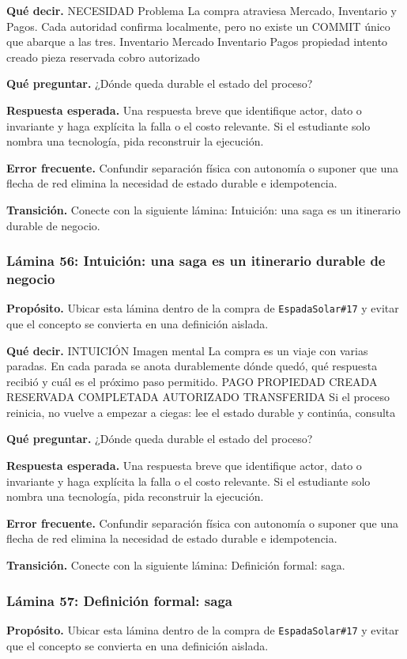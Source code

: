 \documentclass[variant=docente,cover=institutional,mode=screen]{ua-engineering-v6-article}
\begin{document}
\textbf{Qué decir.} NECESIDAD Problema La compra atraviesa Mercado, Inventario y Pagos. Cada autoridad confirma localmente, pero no existe un COMMIT único que abarque a las tres. Inventario Mercado Inventario Pagos propiedad intento creado pieza reservada cobro autorizado

\textbf{Qué preguntar.} ¿Dónde queda durable el estado del proceso?

\textbf{Respuesta esperada.} Una respuesta breve que identifique actor, dato o invariante y haga explícita la falla o el costo relevante. Si el estudiante solo nombra una tecnología, pida reconstruir la ejecución.

\textbf{Error frecuente.} Confundir separación física con autonomía o suponer que una flecha de red elimina la necesidad de estado durable e idempotencia.

\textbf{Transición.} Conecte con la siguiente lámina: Intuición: una saga es un itinerario durable de negocio.

\subsubsection*{Lámina 56: Intuición: una saga es un itinerario durable de negocio}
\textbf{Propósito.} Ubicar esta lámina dentro de la compra de \texttt{EspadaSolar\#17} y evitar que el concepto se convierta en una definición aislada.

\textbf{Qué decir.} INTUICIÓN Imagen mental La compra es un viaje con varias paradas. En cada parada se anota durablemente dónde quedó, qué respuesta recibió y cuál es el próximo paso permitido. PAGO PROPIEDAD CREADA RESERVADA COMPLETADA AUTORIZADO TRANSFERIDA Si el proceso reinicia, no vuelve a empezar a ciegas: lee el estado durable y continúa, consulta

\textbf{Qué preguntar.} ¿Dónde queda durable el estado del proceso?

\textbf{Respuesta esperada.} Una respuesta breve que identifique actor, dato o invariante y haga explícita la falla o el costo relevante. Si el estudiante solo nombra una tecnología, pida reconstruir la ejecución.

\textbf{Error frecuente.} Confundir separación física con autonomía o suponer que una flecha de red elimina la necesidad de estado durable e idempotencia.

\textbf{Transición.} Conecte con la siguiente lámina: Definición formal: saga.

\subsubsection*{Lámina 57: Definición formal: saga}
\textbf{Propósito.} Ubicar esta lámina dentro de la compra de \texttt{EspadaSolar\#17} y evitar que el concepto se convierta en una definición aislada.
\end{document}
